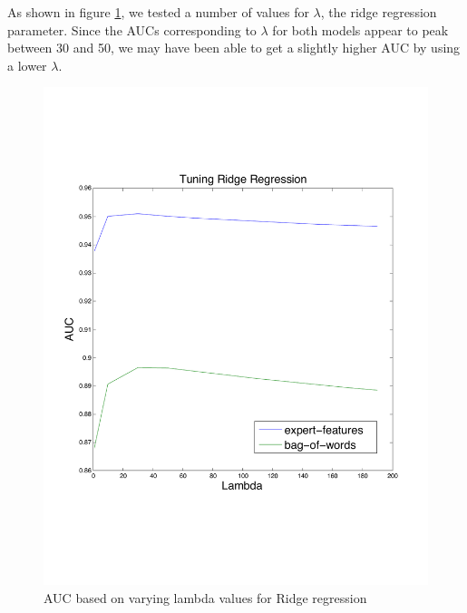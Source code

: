 \documentclass[preprint]{acm_proc_article-sp}
\begin{document}
As shown in figure \ref{fig:lambda}, we tested a number of values for $\lambda$, the ridge regression parameter. 
Since the AUCs corresponding to $\lambda$ for both models appear to peak between 30 and 50, we may have been able to 
get a slightly higher AUC by using a lower $\lambda$.

\begin{figure}[h]
    \centering
    \includegraphics[width=\linewidth]{figures/linear-ridge.pdf}
    \caption{AUC based on varying lambda values for Ridge regression}
    \label{fig:lambda}
\end{figure}
\end{document}
